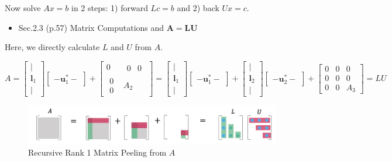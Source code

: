 \documentclass[letterpaper]{article}
\begin{document}
Now solve $Ax=b$ in 2 steps: 1) forward $Lc=b$ and 2) back $Ux=c$.


\begin{itemize}
  \item Sec.2.3 (p.57) Matrix Computations and $\bm{A=LU}$
\end{itemize}

Here, we directly calculate $L$ and $U$ from $A$.

\begin{equation*}
  A = 
      \begin{bmatrix}
        |\\
        \bm{l}_1\\
        |
      \end{bmatrix}
      \begin{bmatrix}
        -  \bm{u}^*_1  -
      \end{bmatrix}
  +  \begin{bmatrix}
      0 & \begin{matrix} 0 & 0 \end{matrix}\\
      \begin{matrix} 0 \\ 0 \end{matrix} & A_2
    \end{bmatrix}
  = 
  \begin{bmatrix}
    |\\
    \bm{l}_1\\
    |
  \end{bmatrix}
  \begin{bmatrix}
    - \bm{u}^*_1 -
  \end{bmatrix}
  +
  \begin{bmatrix}
    |\\
    \bm{l}_2\\
    |
  \end{bmatrix}
  \begin{bmatrix}
    - \bm{u}^*_2  -
  \end{bmatrix}
  +  \begin{bmatrix}
  0 & 0 & 0\\
  0 & 0 & 0 \\
  0 & 0 & A_3
  \end{bmatrix} = LU
\end{equation*}
 

\begin{figure}[H]
  \includegraphics[keepaspectratio, width=\linewidth]{LU1.png}
\caption{Recursive Rank 1 Matrix Peeling from $A$}
\end{figure}
\end{document}
